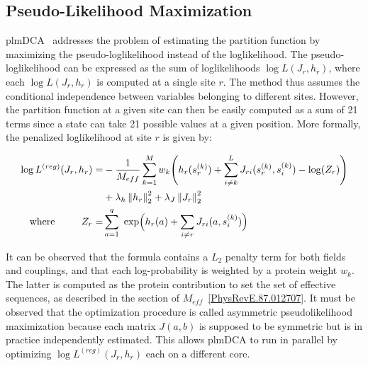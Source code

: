     \subsection{Pseudo-Likelihood Maximization}

        plmDCA~\cite{EKEBERG2014341} addresses the problem of estimating the partition function by maximizing the pseudo-loglikelihood instead of the loglikelihood.
        The pseudo-loglikelihood can be expressed as the sum of loglikelihoods $\log{L}(J_r, h_r)$, where each $\log{L}(J_r, h_r)$ is computed
        at a single site $r$. The method thus assumes the conditional independence between variables belonging to different sites.
        However, the partition function at a given site can then be easily computed as a sum of 21 terms since a state can take 21 possible values at a given position.  %
        More formally, the penalized loglikelihood at site $r$ is given by:

        \begin{equation}
            \begin{split}
                \log{L^{(reg)}}(J_r, h_r) = & -\frac{1}{M_{eff}} \sum\limits_{k=1}^M w_k \Bigg( h_r(s_r^{(k)})
                    + \sum\limits_{i \neq k}^L J_{ri}(s_r^{(k)}, s_i^{(k)}) - \log(Z_r) \Bigg) \\
                & + \lambda_h \left\lVert h_r\right\rVert_2^2 + \lambda_J \left\lVert J_r\right\rVert_2^2 \\
                \text{where} \ \ \ \ \ \ \ \ Z_r = & \sum\limits_{a=1}^q \text{ exp}\Big(h_r(a) + \sum\limits_{i \neq r} J_{ri}(a, s_i^{(k)})\Big)
            \end{split}
        \end{equation}

        It can be observed that the formula contains a $L_2$ penalty term for both fields and couplings,  %
        and that each log-probability is weighted by a protein weight $w_k$.
        The latter is computed as the protein contribution to set the set of effective sequences,
        as described in the section of $M_{eff}$~\ref{PhysRevE.87.012707}.  %
        It must be observed that the optimization procedure is called asymmetric pseudolikelihood maximization because
        each matrix $J(a, b)$ is supposed to be symmetric but is in practice  %
        independently estimated. This allows plmDCA to run in parallel by optimizing $\log{L^{(reg)}}(J_r, h_r)$ each on a different core.

